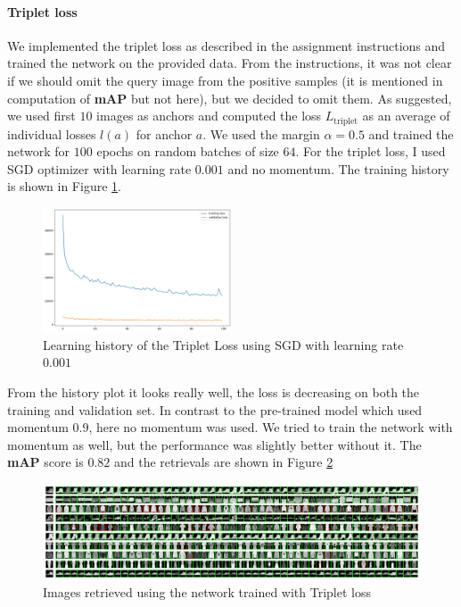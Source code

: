 \documentclass[a4paper,11pt]{article}
\begin{document}
\paragraph{Triplet loss}
We implemented the triplet loss as described in the assignment instructions and trained the network on the provided data.
From the instructions, it was not clear if we should omit the query image from the positive samples (it is mentioned in computation of \textbf{mAP} but not here), but we decided to omit them.
As suggested, we used first $10$ images as anchors and computed the loss $L_{\mathrm{triplet}}$ as an average of individual losses $l(a)$ for anchor $a$.
We used the margin $\alpha=0.5$ and trained the network for $100$ epochs on random batches of size $64$.
For the triplet loss, I used SGD optimizer with learning rate $0.001$ and no momentum.
The training history is shown in Figure \ref{fig:training_triplet}.

\begin{figure}[ht]
    \centering
    \includegraphics[width=0.5\textwidth]{../outputs/learn_triplet.png}
    \caption{Learning history of the Triplet Loss using SGD with learning rate $0.001$}
    \label{fig:training_triplet}
\end{figure}

From the history plot it looks really well, the loss is decreasing on both the training and validation set.
In contrast to the pre-trained model which used momentum $0.9$, here no momentum was used.
We tried to train the network with momentum as well, but the performance was slightly better without it.
The \textbf{mAP} score is $0.82$ and the retrievals are shown in Figure \ref{fig:retrieval_triplet}

\begin{figure}[ht]
    \centering
    \includegraphics[width=\textwidth]{../outputs/triplet_retrieval.png}
    \caption{Images retrieved using the network trained with Triplet loss}
    \label{fig:retrieval_triplet}
\end{figure}
\end{document}
